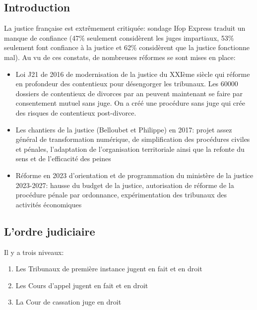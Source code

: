 \documentclass[math]{cours}
\begin{document}
\subsection{Introduction}
La justice française est extrêmement critiquée: sondage Ifop Express traduit un manque de confiance (47\% seulement considèrent les juges impartiaux, 53\% seulement font confiance à la justice et 62\% considèrent que la justice fonctionne mal).
Au vu de ces constats, de nombreuses réformes se sont mises en place:
\begin{itemize}
	\item Loi J21 de 2016 de modernisation de la justice du XXIème siècle qui réforme en profondeur des contentieux pour désengorger les tribunaux.
	      Les 60000 dossiers de contentieux de divorces par an peuvent maintenant se faire par consentement mutuel sans juge.
	      On a créé une procédure sans juge qui crée des risques de contentieux post-divorce.
	\item Les chantiers de la justice (Belloubet et Philippe) en 2017:
	      projet assez général de transformation numérique, de simplification des procédures civiles et pénales, l'adaptation de l'organisation territoriale ainsi que la refonte du sens et de l'efficacité des peines
	\item Réforme en 2023 d'orientation et de programmation du ministère de la justice 2023-2027:
	      hausse du budget de la justice, autorisation de réforme de la procédure pénale par ordonnance, expérimentation des tribunaux des activités économiques
\end{itemize}

\subsection{L'ordre judiciaire}
Il y a trois niveaux:
\begin{enumerate}
	\item Les Tribunaux de première instance jugent en fait et en droit
	\item Les Cours d'appel jugent en fait et en droit
	\item La Cour de cassation juge en droit
\end{enumerate}
\end{document}
